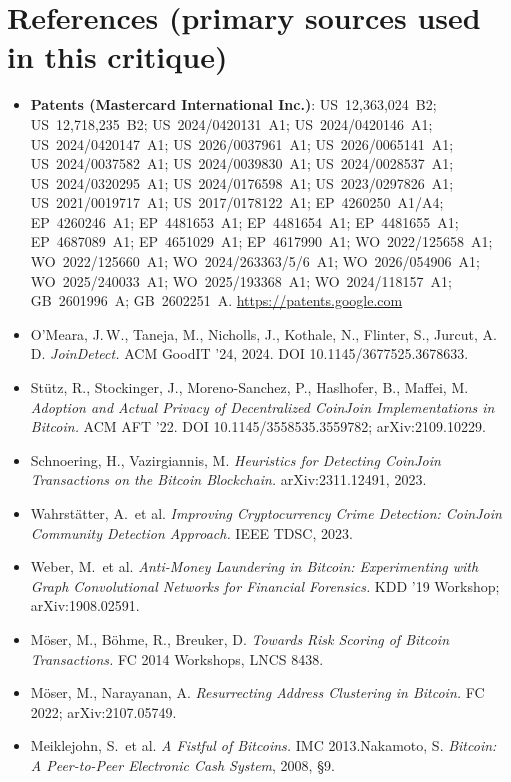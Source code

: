 \documentclass[10pt,a4paper]{article}
\begin{document}
\section*{References (primary sources used in this critique)}
\small
\begin{itemize}[leftmargin=1.2em,itemsep=1pt]
  \item \textbf{Patents (Mastercard International Inc.)}: US~12,363,024~B2; US~12,718,235~B2; US~2024/0420131~A1; US~2024/0420146~A1; US~2024/0420147~A1; US~2026/0037961~A1; US~2026/0065141~A1; US~2024/0037582~A1; US~2024/0039830~A1; US~2024/0028537~A1; US~2024/0320295~A1; US~2024/0176598~A1; US~2023/0297826~A1; US~2021/0019717~A1; US~2017/0178122~A1; EP~4260250~A1/A4; EP~4260246~A1; EP~4481653~A1; EP~4481654~A1; EP~4481655~A1; EP~4687089~A1; EP~4651029~A1; EP~4617990~A1; WO~2022/125658~A1; WO~2022/125660~A1; WO~2024/263363/5/6~A1; WO~2026/054906~A1; WO~2025/240033~A1; WO~2025/193368~A1; WO~2024/118157~A1; GB~2601996~A; GB~2602251~A. \url{https://patents.google.com}
  \item O'Meara, J.\,W., Taneja, M., Nicholls, J., Kothale, N., Flinter, S., Jurcut, A.\,D. \emph{JoinDetect.} ACM GoodIT '24, 2024. DOI 10.1145/3677525.3678633.
  \item St\"utz, R., Stockinger, J., Moreno-Sanchez, P., Haslhofer, B., Maffei, M. \emph{Adoption and Actual Privacy of Decentralized CoinJoin Implementations in Bitcoin.} ACM AFT '22. DOI 10.1145/3558535.3559782; arXiv:2109.10229.
  \item Schnoering, H., Vazirgiannis, M. \emph{Heuristics for Detecting CoinJoin Transactions on the Bitcoin Blockchain.} arXiv:2311.12491, 2023.
  \item Wahrst\"atter, A.\ et al. \emph{Improving Cryptocurrency Crime Detection: CoinJoin Community Detection Approach.} IEEE TDSC, 2023.
  \item Weber, M.\ et al. \emph{Anti-Money Laundering in Bitcoin: Experimenting with Graph Convolutional Networks for Financial Forensics.} KDD '19 Workshop; arXiv:1908.02591.
  \item M\"oser, M., B\"ohme, R., Breuker, D. \emph{Towards Risk Scoring of Bitcoin Transactions.} FC 2014 Workshops, LNCS 8438.
  \item M\"oser, M., Narayanan, A. \emph{Resurrecting Address Clustering in Bitcoin.} FC 2022; arXiv:2107.05749.
  \item Meiklejohn, S.\ et al. \emph{A Fistful of Bitcoins.} IMC 2013.\quad Nakamoto, S. \emph{Bitcoin: A Peer-to-Peer Electronic Cash System}, 2008, \S9.

\end{itemize}
\end{document}
